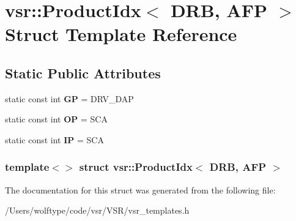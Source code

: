 \hypertarget{structvsr_1_1_product_idx_3_01_d_r_b_00_01_a_f_p_01_4}{\section{vsr\-:\-:Product\-Idx$<$ D\-R\-B, A\-F\-P $>$ Struct Template Reference}
\label{structvsr_1_1_product_idx_3_01_d_r_b_00_01_a_f_p_01_4}
}
\subsection*{Static Public Attributes}
\begin{DoxyCompactItemize}
\item 
\hypertarget{structvsr_1_1_product_idx_3_01_d_r_b_00_01_a_f_p_01_4_aa274ebc6ac7c2fc5e834580fe2b6fb7b}{static const int {\bfseries G\-P} = D\-R\-V\-\_\-\-D\-A\-P}\label{structvsr_1_1_product_idx_3_01_d_r_b_00_01_a_f_p_01_4_aa274ebc6ac7c2fc5e834580fe2b6fb7b}

\item 
\hypertarget{structvsr_1_1_product_idx_3_01_d_r_b_00_01_a_f_p_01_4_a1f8bd86c35eabf79a9c48ba873b396aa}{static const int {\bfseries O\-P} = S\-C\-A}\label{structvsr_1_1_product_idx_3_01_d_r_b_00_01_a_f_p_01_4_a1f8bd86c35eabf79a9c48ba873b396aa}

\item 
\hypertarget{structvsr_1_1_product_idx_3_01_d_r_b_00_01_a_f_p_01_4_a6ecbc2ea05736ef1acdce7ffe777b5eb}{static const int {\bfseries I\-P} = S\-C\-A}\label{structvsr_1_1_product_idx_3_01_d_r_b_00_01_a_f_p_01_4_a6ecbc2ea05736ef1acdce7ffe777b5eb}

\end{DoxyCompactItemize}
\subsubsection*{template$<$$>$ struct vsr\-::\-Product\-Idx$<$ D\-R\-B, A\-F\-P $>$}



The documentation for this struct was generated from the following file\-:\begin{DoxyCompactItemize}
\item 
/\-Users/wolftype/code/vsr/\-V\-S\-R/vsr\-\_\-templates.\-h\end{DoxyCompactItemize}
